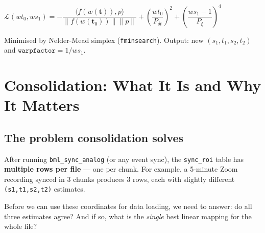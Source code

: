 \documentclass[11pt, a4paper]{article}
\begin{document}
\begin{formulabox}
$\mathcal{L}(wt_0,ws_1) = -\dfrac{\langle f(w(\mathbf{t})),p\rangle}{\|f(w(\mathbf{t}_0))\|\|p\|} + \left(\dfrac{wt_0}{P_{\delta t}}\right)^{\!2} + \left(\dfrac{ws_1-1}{P_\xi}\right)^{\!4}$
\end{formulabox}

Minimised by Nelder-Mead simplex (\texttt{fminsearch}). Output: new $(s_1,t_1,s_2,t_2)$ and $\texttt{warpfactor} = 1/ws_1$.

\section{Consolidation: What It Is and Why It Matters}
\label{sec:consolidate}

\subsection{The problem consolidation solves}

After running \texttt{bml\_sync\_analog} (or any event sync), the \texttt{sync\_roi} table has \textbf{multiple rows per file} --- one per chunk. For example, a 5-minute Zoom recording synced in 3 chunks produces 3 rows, each with slightly different \texttt{(s1,t1,s2,t2)} estimates.

Before we can use these coordinates for data loading, we need to answer: do all three estimates agree? And if so, what is the \emph{single} best linear mapping for the whole file?
\end{document}

